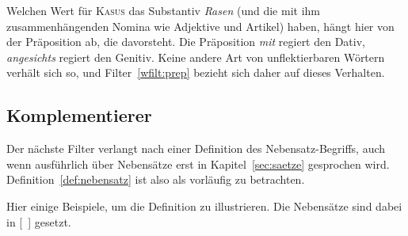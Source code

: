 Welchen Wert für \textsc{Kasus} das Substantiv \textit{Rasen} (und die mit ihm zusammenhängenden Nomina wie Adjektive und Artikel) haben, hängt hier von der Präposition ab, die davorsteht.
Die Präposition \textit{mit} regiert den Dativ, \textit{angesichts} regiert den Genitiv.
Keine andere Art von unflektierbaren Wörtern verhält sich so, und Filter~\ref{wfilt:prep} bezieht sich daher auf dieses Verhalten.


\subsection{Komplementierer}

\label{sec:komplementiererwortklassen}


Der nächste Filter verlangt nach einer Definition des Nebensatz-Begriffs, auch wenn ausführlich über Nebensätze erst in Kapitel~\ref{sec:saetze} gesprochen wird.
Definition~\ref{def:nebensatz} ist also als vorläufig zu betrachten.


Hier einige Beispiele, um die Definition zu illustrieren.
Die Nebensätze sind dabei in [~] gesetzt.

\begin{exe}
\end{exe}


